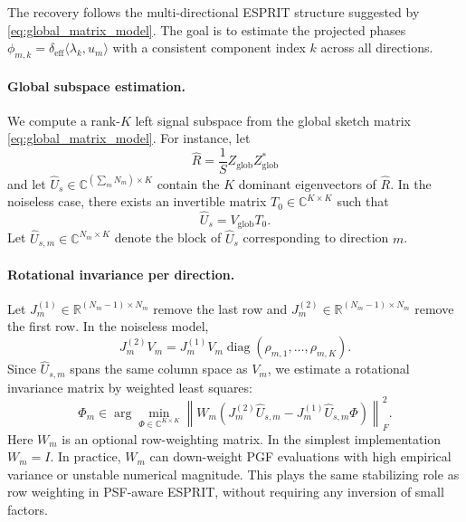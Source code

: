 \documentclass[sigconf,natbib=true,anonymous=true,review=true]{acmart}
\newcommand{\R}{\mathbb{R}}
\newcommand{\C}{\mathbb{C}}
\newcommand{\deff}{\delta_{\mathrm{eff}}}
\begin{document}
The recovery follows the multi-directional ESPRIT structure suggested by
\eqref{eq:global_matrix_model}. The goal is to estimate the projected phases
$\phi_{m,k}=\deff\langle\lambda_k,u_m\rangle$ with a consistent component index $k$
across all directions.

\paragraph{Global subspace estimation.}
We compute a rank-$K$ left signal subspace from the global sketch matrix
\eqref{eq:global_matrix_model}. For instance, let
\begin{equation}
    \widehat R
    =
    \frac1S Z_{\mathrm{glob}}Z_{\mathrm{glob}}^*
\end{equation}
and let $\widehat U_s\in\C^{(\sum_m N_m)\times K}$ contain the $K$ dominant eigenvectors
of $\widehat R$. In the noiseless case, there exists an invertible matrix $T_0\in\C^{K\times K}$
such that
\begin{equation}
    \widehat U_s
    =
    V_{\mathrm{glob}}T_0.
\end{equation}
Let $\widehat U_{s,m}\in\C^{N_m\times K}$ denote the block of $\widehat U_s$
corresponding to direction $m$.

\paragraph{Rotational invariance per direction.}
Let $J_m^{(1)}\in\R^{(N_m-1)\times N_m}$ remove the last row and
$J_m^{(2)}\in\R^{(N_m-1)\times N_m}$ remove the first row. In the noiseless model,
\begin{equation}
    J_m^{(2)}V_m
    =
    J_m^{(1)}V_m
    \operatorname{diag}(\rho_{m,1},\ldots,\rho_{m,K}).
\end{equation}
Since $\widehat U_{s,m}$ spans the same column space as $V_m$, we estimate a rotational
invariance matrix by weighted least squares:
\begin{equation}
    \widehat \Phi_m
    \in
    \arg\min_{\Phi\in\C^{K\times K}}
    \left\|
        W_m
        \left(
            J_m^{(2)}\widehat U_{s,m}
            -
            J_m^{(1)}\widehat U_{s,m}\Phi
        \right)
    \right\|_F^2.
    \label{eq:weighted_esprit}
\end{equation}
Here $W_m$ is an optional row-weighting matrix. In the simplest implementation
$W_m=I$. In practice, $W_m$ can down-weight PGF evaluations with high empirical
variance or unstable numerical magnitude. This plays the same stabilizing role as
row weighting in PSF-aware ESPRIT, without requiring any inversion of small factors.
\end{document}
